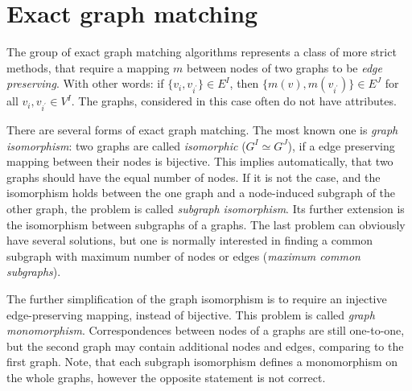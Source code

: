 \section{Exact graph matching}
The group of exact graph matching algorithms represents a class of more strict methods, that require a mapping $m$ between nodes of two graphs to be \emph{edge preserving}. With other words: if $\{v_i,v_{i^\prime}\}\in E^I$, then $\{m(v),m(v_{i^\prime})\}\in E^J$ for all $v_i,v_{i^\prime}\in V^I$. The graphs, considered in this case often do not have attributes.

There are several forms of exact graph matching. The most known one is \emph{graph isomorphism}: two graphs are called \emph{isomorphic} ($G^I\simeq G^J$), if a edge preserving mapping between their nodes is bijective. This implies automatically, that two graphs should have the equal number of nodes. If it is not the case, and the isomorphism holds between the one graph and a node-induced subgraph of the other graph, the problem is called \emph{subgraph isomorphism}. Its further extension is the isomorphism between subgraphs of a graphs. The last problem can obviously have several solutions, but one is normally interested in finding a common subgraph with maximum number of nodes or edges (\emph{maximum common subgraphs}).  

The further simplification of the graph isomorphism is to require an injective edge-preserving mapping, instead of bijective. This problem is called \emph{graph monomorphism}. Correspondences between nodes of a graphs are still one-to-one, but the second graph may contain additional nodes and edges, comparing to the first graph. Note, that each subgraph isomorphism defines a monomorphism on the whole graphs, however the opposite statement is not correct.


